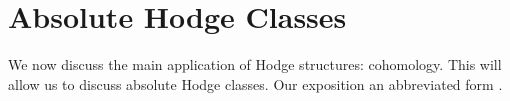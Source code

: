 \documentclass[../thesis.tex]{subfiles}
\begin{document}



\section{Absolute Hodge Classes}
We now discuss the main application of Hodge structures: cohomology. This will allow us to discuss absolute Hodge classes. Our exposition an abbreviated form \cite{deligne-hodge}.
\end{document}
